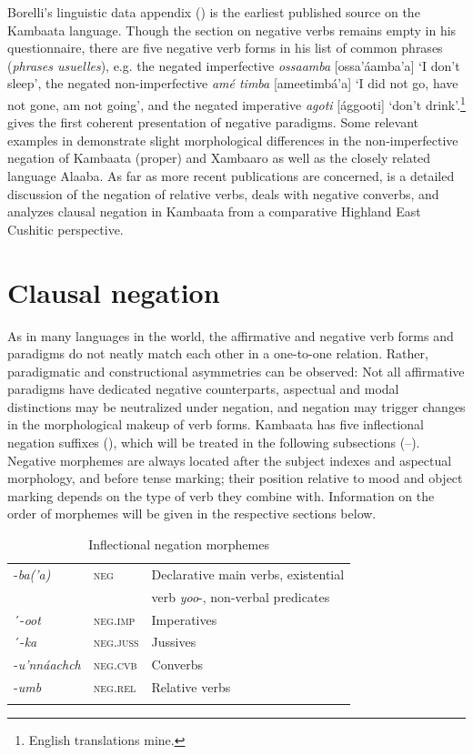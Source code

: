\documentclass[output=paper,colorlinks,citecolor=brown,draftmode
]{langscibook}
\begin{document}
Borelli’s linguistic data appendix (\citeyear[463--482]{Borelli1890}) is the earliest published source on the Kambaata language. Though the section on negative verbs remains empty in his questionnaire, there are five negative verb forms in his list of common phrases (\textit{phrases usuelles}), e.g. the negated imperfective \textit{ossaamba} [ossa’áamba’a] ‘I don’t sleep’, the negated non-imperfective \textit{amé timba} [ameetimbá’a] ‘I did not go, have not gone, am not going’, and the negated imperative \textit{agoti} [ággooti] ‘don’t drink’.\footnote{English translations mine.} \citet{Leslau1952} gives the first coherent presentation of negative paradigms. Some relevant examples in \citet[90--108]{KorhonenEtAl1986} demonstrate slight morphological differences in the non-imperfective negation of Kambaata (proper) and Xambaaro as well as the closely related language Alaaba. As far as more recent publications are concerned, \citet{Treis2012a} is a detailed discussion of the negation of relative verbs, \citet[86--90]{Treis2012c} deals with negative converbs, and \citet{Treis2012b} analyzes clausal negation in Kambaata from a comparative Highland East Cushitic perspective. 

\section{Clausal negation}\label{sec:treis:2}

As in many languages in the world, the affirmative and negative verb forms and paradigms do not neatly match each other in a one-to-one relation. Rather, paradigmatic and constructional asymmetries \citep{Miestamo2013-wals113} can be observed: Not all affirmative paradigms have dedicated negative counterparts, aspectual and modal distinctions may be neutralized under negation, and negation may trigger changes in the morphological makeup of verb forms. Kambaata has five inflectional negation suffixes (), which will be treated in the following subsections (--). Negative morphemes are always located after the subject indexes and aspectual morphology, and before tense marking; their position relative to mood and object marking depends on the type of verb they combine with. Information on the order of morphemes will be given in the respective sections below.


\begin{table} 
\caption{Inflectional negation morphemes}
\label{tab:treis:1}
 \begin{tabular}{lll}
  \lsptoprule
-\textit{ba(’a)} & \textsc{neg} & Declarative main verbs, existential \\
& & verb \textit{yoo}-, non-verbal predicates\\
´-\textit{oot} & \textsc{neg.imp} & Imperatives\\
´-\textit{ka} & \textsc{neg.juss} & Jussives\\
-\textit{u’nnáachch} & \textsc{neg.cvb}	& Converbs\\
-\textit{umb} & \textsc{neg.rel} & Relative verbs\\
  \lspbottomrule
 \end{tabular}
\end{table}
\end{document}
